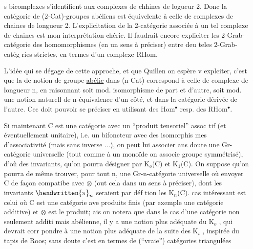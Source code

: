 
s bicomplexes s'identifient aux complexes de chhines de logueur 2.
Donc la catégorie de (2-Cat)-groupes abéliens est équivelente à celle de
complexes de chaines de longueur 2. L'explicitation de la 2-catégorie
associée à un tel complexe de chaines est mon interprétation chérie. Il
faudrait encore expliciter les  2-Grab-catégorie des
homomorphismes (en un sens à préciser) entre deu teles 2-Grab-catég
ries strictes, en termes d'un complexe RHom.

L'idée qui se dégage de cette approche, et que Quillen on espère v
explciter, c'est que la  de notion de groupe \uline{abélie}
dans (n-Cat) correspond à celle de complexe de  longueur n, en raisonnant
soit mod. isomorphisme de part et d'autre, soit mod. une notion naturell
de n-équivalence d'un côté, et dans la catégorie dérivée de l'autre. Cec
doit pouvoir se préciser en utilisant des Hom$^{\bullet}$ resp. des RHom$^{\bullet}$.

Si maintenant C est une catégorie avec un ``produit tensoriel'' assoc
tif (et éventuellement unitaire), i.e. un bifoncteur avec des isomorphis%
mes d'associativité (mais sans inverse ...), on peut lui associer ans
doute une Gr-catégorie universelle (tout comme à un monoïde on associe
groupe symmétrisé), d'où des invariants, qu'on pourra désigner par K$_{o}$(C)
et K$_{1}$(C). On suppose qu'on pourra de même trouver, pour tout n, une
Gr-n-catégorie universelle où envoyer C de façon compatibe avec $\otimes$ (out
cela dans un sens à préciser), dont les invariants $\handwritten{\pi}_{n}$ seraient par déf
tion les K$_{n}$(C).  cas intéressant est celui où C est une catégorie ave
produits finis (par exemple une catégorie additive) et $\otimes$ est le produit;
\deleted{(}\handwritten{[}ais on notera que dans le cas d'une catégorie non seulement additi
mais abélienne, il y a une notion plus adéquate du K$_{o}$ , qui devrait corr
pondre à une notion plus adéquate de la suite des K$_{i}$ , inspirée du tapis
de Roos; sans doute c'est en termes de (``vraie'') catégories triangulées


